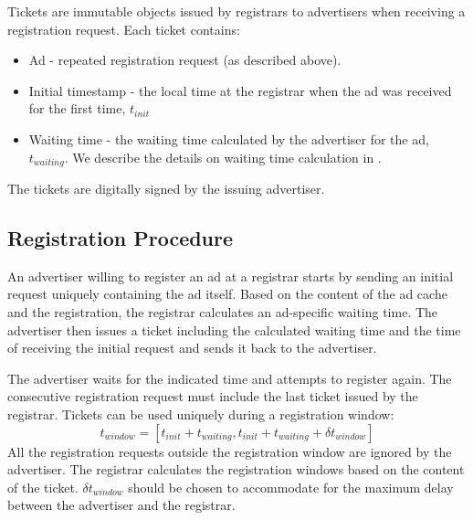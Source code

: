 Tickets are immutable objects issued by registrars to advertisers when receiving a registration request. Each ticket contains:
\begin{itemize}
    \item Ad - repeated registration request (as described above). 
    \item Initial timestamp - the local time at the registrar when the ad was received for the first time, $t_\textit{init}$
    \item Waiting time - the waiting time calculated by the advertiser for the ad, $t_\textit{waiting}$. We describe the details on waiting time calculation in . 
\end{itemize}
The tickets are digitally signed by the issuing advertiser. 

\subsection{Registration Procedure}
An advertiser willing to register an ad at a registrar starts by sending an
initial request uniquely containing the ad itself. Based on the
content of the ad cache and the registration, the registrar calculates an
ad-specific waiting time. The advertiser then issues a ticket including the
calculated waiting time and the time of receiving the initial request and sends it back to the advertiser.

The advertiser waits for the indicated time and attempts to register again. The consecutive registration request must include the last ticket issued by the registrar. Tickets can be used uniquely during a registration window:
\begin{equation}\label{eq:registration_window}
    t_\textit{window} = [t_\textit{init} + t_\textit{waiting}, t_\textit{init} + t_\textit{waiting} + \delta t_\textit{window}]
\end{equation}
All the registration requests outside the registration window are ignored by the advertiser. The registrar calculates the registration windows based on the content of the ticket. $\delta t_\textit{window}$ should be chosen to accommodate for the maximum delay between the advertiser and the registrar. 

